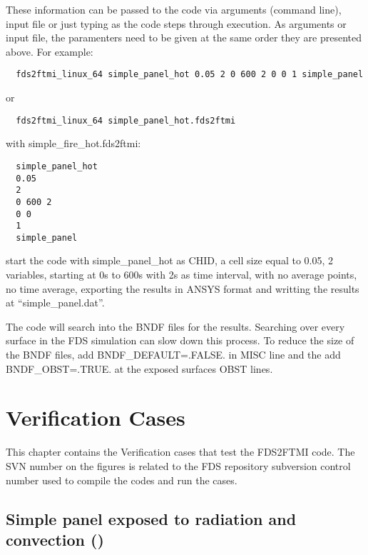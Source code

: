 \documentclass[11pt]{book}
\begin{document}
These information can be passed to the code via arguments (command line), input file or just typing as the code steps through execution. As arguments or input file, the paramenters need to be given at the same order they are presented above. For example:
\begin{verbatim}
  fds2ftmi_linux_64 simple_panel_hot 0.05 2 0 600 2 0 0 1 simple_panel
\end{verbatim}
  or 
\begin{verbatim}
  fds2ftmi_linux_64 simple_panel_hot.fds2ftmi 
\end{verbatim}
with simple\_fire\_hot.fds2ftmi:
\begin{verbatim}
  simple_panel_hot 
  0.05 
  2
  0 600 2 
  0 0
  1
  simple_panel
\end{verbatim}
start the code with simple\_panel\_hot as {\ct CHID}, a cell size equal to 0.05, 2 variables, starting at 0s to 600s with 2s as time interval, with no average points, no time average, exporting the results in A{\footnotesize NSYS} format and writting the results at ``simple\_panel.dat''.

The code will search into the {\ct BNDF} files for the results. Searching over every surface in the FDS simulation can slow down this process. To reduce the size of the {\ct BNDF} files, add {\ct BNDF\_DEFAULT=.FALSE.} in {\ct MISC} line and the add {\ct BNDF\_OBST=.TRUE.} at the exposed surfaces {\ct OBST} lines.

\chapter{Verification Cases}
\label{info:verification}

This chapter contains the Verification cases that test the FDS2FTMI code. The SVN number on the figures is related to the FDS repository \cite{FDS-SMV_repository} subversion control number used to compile the codes and run the cases.  

\section{Simple panel exposed to radiation and convection (\texorpdfstring{}{simple\_panel\_hot})}
\end{document}
